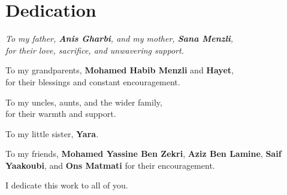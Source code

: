 \chapter*{Dedication}

\vspace{1cm}

\begin{center}
\itshape
To my father, \textbf{Anis Gharbi}, and my mother, \textbf{Sana Menzli},\\
for their love, sacrifice, and unwavering support.

\vspace{0.5cm}
To my grandparents, \textbf{Mohamed Habib Menzli} and \textbf{Hayet},\\
for their blessings and constant encouragement.

\vspace{0.5cm}
To my uncles, aunts, and the wider family,\\
for their warmth and support.

\vspace{0.5cm}
To my little sister, \textbf{Yara}.

\vspace{0.5cm}
To my friends, \textbf{Mohamed Yassine Ben Zekri}, \textbf{Aziz Ben Lamine},
\textbf{Saif Yaakoubi}, and \textbf{Ons Matmati}
for their encouragement. 

\vspace{0.8cm}
I dedicate this work to all of you.
\end{center}
